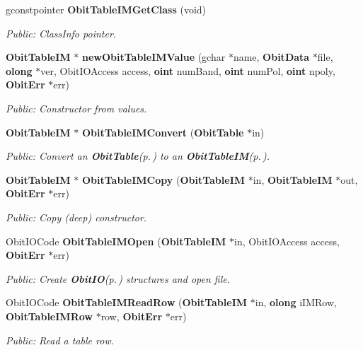 \begin{CompactItemize}
gconstpointer {\bf Obit\-Table\-IMGet\-Class} (void)
\begin{CompactList}\small\item\em Public: Class\-Info pointer. \item\end{CompactList}\item 
{\bf Obit\-Table\-IM} $\ast$ {\bf new\-Obit\-Table\-IMValue} (gchar $\ast$name, {\bf Obit\-Data} $\ast$file, {\bf olong} $\ast$ver, Obit\-IOAccess access, {\bf oint} num\-Band, {\bf oint} num\-Pol, {\bf oint} npoly, {\bf Obit\-Err} $\ast$err)
\begin{CompactList}\small\item\em Public: Constructor from values. \item\end{CompactList}\item 
{\bf Obit\-Table\-IM} $\ast$ {\bf Obit\-Table\-IMConvert} ({\bf Obit\-Table} $\ast$in)
\begin{CompactList}\small\item\em Public: Convert an {\bf Obit\-Table}{\rm (p.\,\pageref{structObitTable})} to an {\bf Obit\-Table\-IM}{\rm (p.\,\pageref{structObitTableIM})}. \item\end{CompactList}\item 
{\bf Obit\-Table\-IM} $\ast$ {\bf Obit\-Table\-IMCopy} ({\bf Obit\-Table\-IM} $\ast$in, {\bf Obit\-Table\-IM} $\ast$out, {\bf Obit\-Err} $\ast$err)
\begin{CompactList}\small\item\em Public: Copy (deep) constructor. \item\end{CompactList}\item 
Obit\-IOCode {\bf Obit\-Table\-IMOpen} ({\bf Obit\-Table\-IM} $\ast$in, Obit\-IOAccess access, {\bf Obit\-Err} $\ast$err)
\begin{CompactList}\small\item\em Public: Create {\bf Obit\-IO}{\rm (p.\,\pageref{structObitIO})} structures and open file. \item\end{CompactList}\item 
Obit\-IOCode {\bf Obit\-Table\-IMRead\-Row} ({\bf Obit\-Table\-IM} $\ast$in, {\bf olong} i\-IMRow, {\bf Obit\-Table\-IMRow} $\ast$row, {\bf Obit\-Err} $\ast$err)
\begin{CompactList}\small\item\em Public: Read a table row. \item\end{CompactList}\item 

\end{CompactItemize}
